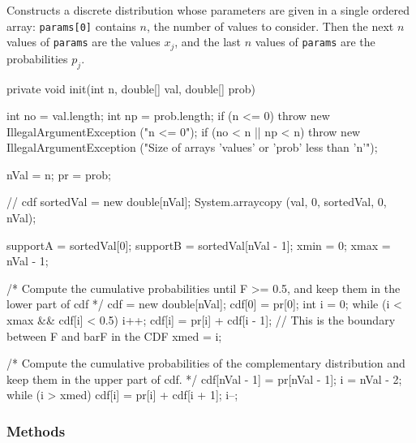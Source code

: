 \begin{tabb}
   Constructs a discrete distribution whose parameters are given
   in a single ordered array: \texttt{params[0]} contains $n$, the number of
   values to consider. Then the next $n$ values of \texttt{params} are the
   values $x_j$, and the last $n$ values of \texttt{params}
   are the probabilities $p_j$.
\end{tabb}
\begin{hide}\begin{code}

   private void init(int n, double[] val, double[] prob) {
      int no = val.length;
      int np = prob.length;
      if (n <= 0)
         throw new IllegalArgumentException ("n <= 0");
      if (no < n || np < n)
         throw new IllegalArgumentException
         ("Size of arrays 'values' or 'prob' less than 'n'");

      nVal = n;
      pr = prob;

      // cdf
      sortedVal = new double[nVal];
      System.arraycopy (val, 0, sortedVal, 0, nVal);

      supportA = sortedVal[0];
      supportB = sortedVal[nVal - 1];
      xmin = 0;
      xmax = nVal - 1;

      /* Compute the cumulative probabilities until F >= 0.5, and keep them in
         the lower part of cdf */
      cdf = new double[nVal];
      cdf[0] = pr[0];
      int i = 0;
      while (i < xmax && cdf[i] < 0.5) {
         i++;
         cdf[i] = pr[i] + cdf[i - 1];
      }
      // This is the boundary between F and barF in the CDF
      xmed = i;

      /* Compute the cumulative probabilities of the complementary
         distribution and keep them in the upper part of cdf. */
      cdf[nVal - 1] = pr[nVal - 1];
      i = nVal - 2;
      while (i > xmed) {
         cdf[i] = pr[i] + cdf[i + 1];
         i--;
      }
}\end{code}\end{hide}


\subsubsection* {Methods}

